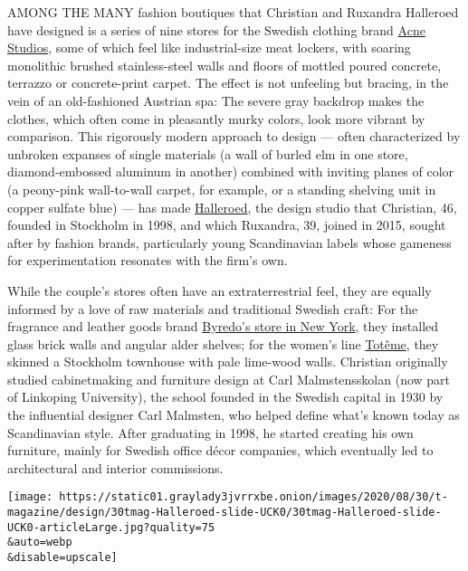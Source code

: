 AMONG THE MANY fashion boutiques that Christian and Ruxandra Halleroed
have designed is a series of nine stores for the Swedish clothing brand
\href{https://halleroed.com/project-index/acne-studios/}{Acne Studios},
some of which feel like industrial-size meat lockers, with soaring
monolithic brushed stainless-steel walls and floors of mottled poured
concrete, terrazzo or concrete-print carpet. The effect is not unfeeling
but bracing, in the vein of an old-fashioned Austrian spa: The severe
gray backdrop makes the clothes, which often come in pleasantly murky
colors, look more vibrant by comparison. This rigorously modern approach
to design --- often characterized by unbroken expanses of single
materials (a wall of burled elm in one store, diamond-embossed aluminum
in another) combined with inviting planes of color (a peony-pink
wall-to-wall carpet, for example, or a standing shelving unit in copper
sulfate blue) --- has made \href{https://halleroed.com/}{Halleroed}, the
design studio that Christian, 46, founded in Stockholm in 1998, and
which Ruxandra, 39, joined in 2015, sought after by fashion brands,
particularly young Scandinavian labels whose gameness for
experimentation resonates with the firm's own.

While the couple's stores often have an extraterrestrial feel, they are
equally informed by a love of raw materials and traditional Swedish
craft: For the fragrance and leather goods brand
\href{https://halleroed.com/projects/byredo-wooster-street-new-york/}{Byredo's
store in New York}, they installed glass brick walls and angular alder
shelves; for the women's line
\href{https://halleroed.com/project-index/toteme/}{Totême}, they skinned
a Stockholm townhouse with pale lime-wood walls. Christian originally
studied cabinetmaking and furniture design at Carl Malmstensskolan (now
part of Linkoping University), the school founded in the Swedish capital
in 1930 by the influential designer Carl Malmsten, who helped define
what's known today as Scandinavian style. After graduating in 1998, he
started creating his own furniture, mainly for Swedish office décor
companies, which eventually led to architectural and interior
commissions.

\texttt{[image: https://static01.graylady3jvrrxbe.onion/images/2020/08/30/t-magazine/design/30tmag-Halleroed-slide-UCK0/30tmag-Halleroed-slide-UCK0-articleLarge.jpg?quality=75\\\&auto=webp\\\&disable=upscale]}

